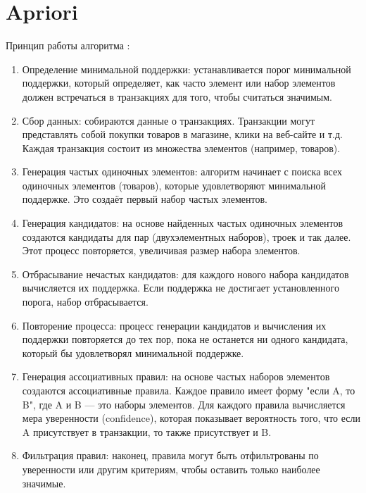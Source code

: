 \documentclass[12pt]{report}
\begin{document}
\section{Apriori}
Принцип работы алгоритма \cite{apyori}:
\begin{enumerate}
    \item Определение минимальной поддержки: устанавливается порог минимальной поддержки, который определяет, как часто элемент или набор элементов должен встречаться в транзакциях для того, чтобы считаться значимым.

    \item Сбор данных: собираются данные о транзакциях. Транзакции могут представлять собой покупки товаров в магазине, клики на веб-сайте и т.д. Каждая транзакция состоит из множества элементов (например, товаров).

    \item Генерация частых одиночных элементов: алгоритм начинает с поиска всех одиночных элементов (товаров), которые удовлетворяют минимальной поддержке. Это создаёт первый набор частых элементов.

    \item Генерация кандидатов: на основе найденных частых одиночных элементов создаются кандидаты для пар (двухэлементных наборов), троек и так далее. Этот процесс повторяется, увеличивая размер набора элементов.

    \item Отбрасывание нечастых кандидатов: для каждого нового набора кандидатов вычисляется их поддержка. Если поддержка не достигает установленного порога, набор отбрасывается.

    \item Повторение процесса: процесс генерации кандидатов и вычисления их поддержки повторяется до тех пор, пока не останется ни одного кандидата, который бы удовлетворял минимальной поддержке.

    \item Генерация ассоциативных правил: на основе частых наборов элементов создаются ассоциативные правила. Каждое правило имеет форму "если A, то B", где A и B — это наборы элементов. Для каждого правила вычисляется мера уверенности (confidence), которая показывает вероятность того, что если A присутствует в транзакции, то также присутствует и B.

    \item Фильтрация правил: наконец, правила могут быть отфильтрованы по уверенности или другим критериям, чтобы оставить только наиболее значимые.
\end{enumerate}
\end{document}

